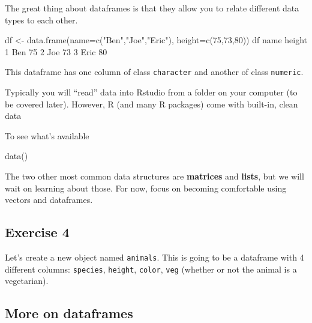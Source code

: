 \documentclass[
]{book}
\newenvironment{Shaded}{\begin{snugshade}}{\end{snugshade}}
\newcommand{\AttributeTok}[1]{\textcolor[rgb]{0.77,0.63,0.00}{#1}}
\newcommand{\DecValTok}[1]{\textcolor[rgb]{0.00,0.00,0.81}{#1}}
\newcommand{\FunctionTok}[1]{\textcolor[rgb]{0.00,0.00,0.00}{#1}}
\newcommand{\NormalTok}[1]{#1}
\newcommand{\OtherTok}[1]{\textcolor[rgb]{0.56,0.35,0.01}{#1}}
\newcommand{\StringTok}[1]{\textcolor[rgb]{0.31,0.60,0.02}{#1}}
\begin{document}
The great thing about dataframes is that they allow you to relate different data types to each other.

\begin{Shaded}
\begin{Highlighting}[]
\NormalTok{df }\OtherTok{\textless{}{-}} \FunctionTok{data.frame}\NormalTok{(}\AttributeTok{name=}\FunctionTok{c}\NormalTok{(}\StringTok{"Ben"}\NormalTok{,}\StringTok{"Joe"}\NormalTok{,}\StringTok{"Eric"}\NormalTok{),}
                 \AttributeTok{height=}\FunctionTok{c}\NormalTok{(}\DecValTok{75}\NormalTok{,}\DecValTok{73}\NormalTok{,}\DecValTok{80}\NormalTok{))}
\NormalTok{df}
\NormalTok{  name height}
\DecValTok{1}\NormalTok{  Ben     }\DecValTok{75}
\DecValTok{2}\NormalTok{  Joe     }\DecValTok{73}
\DecValTok{3}\NormalTok{ Eric     }\DecValTok{80}
\end{Highlighting}
\end{Shaded}

This dataframe has one column of class \texttt{character} and another of class \texttt{numeric}.

Typically you will ``read'' data into Rstudio from a folder on your computer (to be covered later). However, R (and many R packages) come with built-in, clean data

To see what's available

\begin{Shaded}
\begin{Highlighting}[]
\FunctionTok{data}\NormalTok{()}
\end{Highlighting}
\end{Shaded}

The two other most common data structures are \textbf{matrices} and \textbf{lists}, but we will wait on learning about those. For now, focus on becoming comfortable using vectors and dataframes.

\hypertarget{exercise-4-2}{%
\subsection*{Exercise 4}\label{exercise-4-2}}

Let's create a new object named \texttt{animals}. This is going to be a dataframe with 4 different columns: \texttt{species}, \texttt{height}, \texttt{color}, \texttt{veg} (whether or not the animal is a vegetarian).

\hypertarget{more-on-dataframes}{%
\subsection{More on dataframes}\label{more-on-dataframes}}
\end{document}
